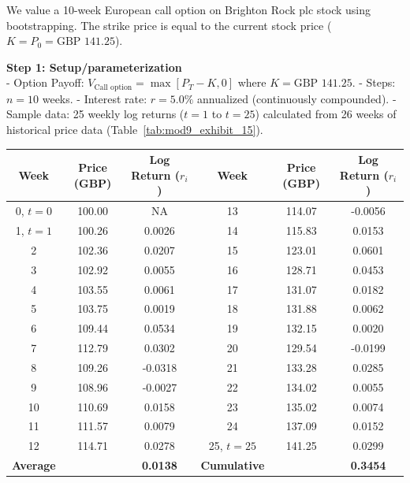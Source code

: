 \begin{tcolorbox}[
	colback=gray!5!white,
	colframe=black!15!white,
	boxrule=0.5pt,
	arc=3pt,
	title=\textbf{Case Study: Bootstrapping Techniques to Value a European-Style Call Option on Brighton Rock plc Stock},
	coltitle=black,
	colbacktitle=black!5!white,
	before skip=6pt,
	after skip=6pt,
	breakable
]
We value a 10-week European call option on Brighton Rock plc stock using bootstrapping. The strike price is equal to the current stock price ($K = P_0 = \text{GBP } 141.25$).

\textbf{Step 1: Setup/parameterization} \\
- Option Payoff: $V_{\text{Call option}} = \max[P_T - K, 0]$ where $K = \text{GBP } 141.25$.
- Steps: $n = 10$ weeks.
- Interest rate: $r = 5.0\%$ annualized (continuously compounded).
- Sample data: 25 weekly log returns ($t = 1$ to $t = 25$) calculated from 26 weeks of historical price data (Table~\ref{tab:mod9_exhibit_15}).

\begin{center}
\centering
{}
\label{tab:mod9_exhibit_15}
\begin{tabular}{c c c | c c c}
	\toprule
	\textbf{Week} & \textbf{Price (GBP)} & \textbf{Log Return ($r_i$)} & \textbf{Week} & \textbf{Price (GBP)} & \textbf{Log Return ($r_i$)} \\
	\midrule
	0, $t = 0$ & 100.00 & NA & 13 & 114.07 & -0.0056 \\
	1, $t = 1$ & 100.26 & 0.0026 & 14 & 115.83 & 0.0153 \\
	2 & 102.36 & 0.0207 & 15 & 123.01 & 0.0601 \\
	3 & 102.92 & 0.0055 & 16 & 128.71 & 0.0453 \\
	4 & 103.55 & 0.0061 & 17 & 131.07 & 0.0182 \\
	5 & 103.75 & 0.0019 & 18 & 131.88 & 0.0062 \\
	6 & 109.44 & 0.0534 & 19 & 132.15 & 0.0020 \\
	7 & 112.79 & 0.0302 & 20 & 129.54 & -0.0199 \\
	8 & 109.26 & -0.0318 & 21 & 133.28 & 0.0285 \\
	9 & 108.96 & -0.0027 & 22 & 134.02 & 0.0055 \\
	10 & 110.69 & 0.0158 & 23 & 135.02 & 0.0074 \\
	11 & 111.57 & 0.0079 & 24 & 137.09 & 0.0152 \\
	12 & 114.71 & 0.0278 & 25, $t = 25$ & 141.25 & 0.0299 \\
	\midrule
	\textbf{Average} & & \textbf{0.0138} & \textbf{Cumulative} & & \textbf{0.3454} \\
	\bottomrule
\end{tabular}
\end{center}


\end{tcolorbox}
